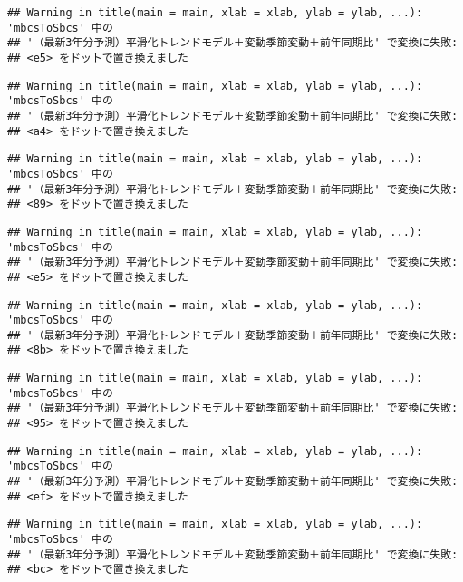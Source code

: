 \documentclass[]{article}
\begin{document}
\begin{verbatim}
## Warning in title(main = main, xlab = xlab, ylab = ylab, ...): 'mbcsToSbcs' 中の
## '（最新3年分予測）平滑化トレンドモデル＋変動季節変動＋前年同期比' で変換に失敗:
## <e5> をドットで置き換えました
\end{verbatim}

\begin{verbatim}
## Warning in title(main = main, xlab = xlab, ylab = ylab, ...): 'mbcsToSbcs' 中の
## '（最新3年分予測）平滑化トレンドモデル＋変動季節変動＋前年同期比' で変換に失敗:
## <a4> をドットで置き換えました
\end{verbatim}

\begin{verbatim}
## Warning in title(main = main, xlab = xlab, ylab = ylab, ...): 'mbcsToSbcs' 中の
## '（最新3年分予測）平滑化トレンドモデル＋変動季節変動＋前年同期比' で変換に失敗:
## <89> をドットで置き換えました
\end{verbatim}

\begin{verbatim}
## Warning in title(main = main, xlab = xlab, ylab = ylab, ...): 'mbcsToSbcs' 中の
## '（最新3年分予測）平滑化トレンドモデル＋変動季節変動＋前年同期比' で変換に失敗:
## <e5> をドットで置き換えました
\end{verbatim}

\begin{verbatim}
## Warning in title(main = main, xlab = xlab, ylab = ylab, ...): 'mbcsToSbcs' 中の
## '（最新3年分予測）平滑化トレンドモデル＋変動季節変動＋前年同期比' で変換に失敗:
## <8b> をドットで置き換えました
\end{verbatim}

\begin{verbatim}
## Warning in title(main = main, xlab = xlab, ylab = ylab, ...): 'mbcsToSbcs' 中の
## '（最新3年分予測）平滑化トレンドモデル＋変動季節変動＋前年同期比' で変換に失敗:
## <95> をドットで置き換えました
\end{verbatim}

\begin{verbatim}
## Warning in title(main = main, xlab = xlab, ylab = ylab, ...): 'mbcsToSbcs' 中の
## '（最新3年分予測）平滑化トレンドモデル＋変動季節変動＋前年同期比' で変換に失敗:
## <ef> をドットで置き換えました
\end{verbatim}

\begin{verbatim}
## Warning in title(main = main, xlab = xlab, ylab = ylab, ...): 'mbcsToSbcs' 中の
## '（最新3年分予測）平滑化トレンドモデル＋変動季節変動＋前年同期比' で変換に失敗:
## <bc> をドットで置き換えました
\end{verbatim}
\end{document}
